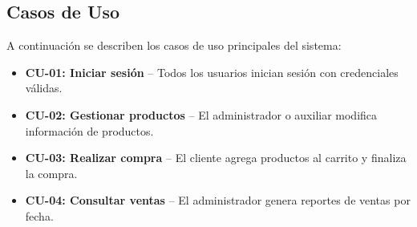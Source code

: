 \subsection{Casos de Uso}

A continuación se describen los casos de uso principales del sistema:

\begin{itemize}
  \item \textbf{CU-01: Iniciar sesión} – Todos los usuarios inician sesión con credenciales válidas.
  \item \textbf{CU-02: Gestionar productos} – El administrador o auxiliar modifica información de productos.
  \item \textbf{CU-03: Realizar compra} – El cliente agrega productos al carrito y finaliza la compra.
  \item \textbf{CU-04: Consultar ventas} – El administrador genera reportes de ventas por fecha.
\end{itemize}
